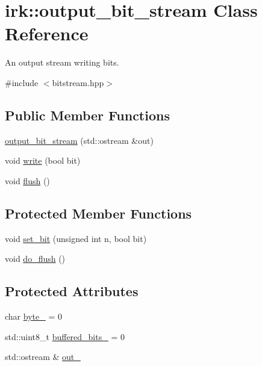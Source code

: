 \hypertarget{classirk_1_1output__bit__stream}{}\section{irk\+:\+:output\+\_\+bit\+\_\+stream Class Reference}
\label{classirk_1_1output__bit__stream}


An output stream writing bits.  




{\ttfamily \#include $<$bitstream.\+hpp$>$}

\subsection*{Public Member Functions}
\begin{DoxyCompactItemize}
\item 
\mbox{\hyperlink{classirk_1_1output__bit__stream_a4977860663181c0c6e0850739d730ada}{output\+\_\+bit\+\_\+stream}} (std\+::ostream \&out)
\item 
void \mbox{\hyperlink{classirk_1_1output__bit__stream_a23f0ccc327c453a5fc24dba747cd4ea4}{write}} (bool bit)
\item 
void \mbox{\hyperlink{classirk_1_1output__bit__stream_a9ab44726c22d696cf681714404e280a7}{flush}} ()
\end{DoxyCompactItemize}
\subsection*{Protected Member Functions}
\begin{DoxyCompactItemize}
\item 
void \mbox{\hyperlink{classirk_1_1output__bit__stream_a0ce598603c6cbdaba17877e298d31102}{set\+\_\+bit}} (unsigned int n, bool bit)
\item 
void \mbox{\hyperlink{classirk_1_1output__bit__stream_a9fb465b2bb42cd5621139ee629900f27}{do\+\_\+flush}} ()
\end{DoxyCompactItemize}
\subsection*{Protected Attributes}
\begin{DoxyCompactItemize}
\item 
char \mbox{\hyperlink{classirk_1_1output__bit__stream_a7ed815d7ac6b8248374cee46ab28cd5b}{byte\+\_\+}} = 0
\item 
std\+::uint8\+\_\+t \mbox{\hyperlink{classirk_1_1output__bit__stream_a7b594ff3d7777cf948cb40f4c89a32d0}{buffered\+\_\+bits\+\_\+}} = 0
\item 
std\+::ostream \& \mbox{\hyperlink{classirk_1_1output__bit__stream_ac8e6feb2595f3e6517d90abbe60c587e}{out\+\_\+}}
\end{DoxyCompactItemize}


